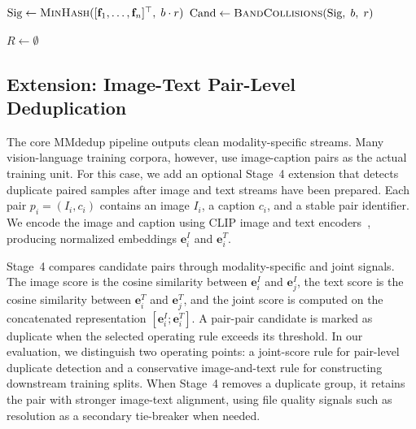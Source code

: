 \documentclass[conference]{IEEEtran}
\begin{document}
\begin{algorithm}[t]
\caption{Audio Deduplication}
\label{alg:audio_dedup}


$\text{Sig} \leftarrow 
\textsc{MinHash}([\mathbf{f}_1, \dots, \mathbf{f}_n]^\top,\; b \cdot r)$\;
$\text{Cand} \leftarrow 
\textsc{BandCollisions}(\text{Sig},\; b,\; r)$\;

$R \leftarrow \emptyset$

\end{algorithm}

\subsection{Extension: Image-Text Pair-Level Deduplication}
\label{sec:stage4_design}

The core MMdedup pipeline outputs clean modality-specific streams. Many vision-language training corpora, however, use image-caption pairs as the actual training unit. For this case, we add an optional Stage~4 extension that detects duplicate paired samples after image and text streams have been prepared. Each pair $p_i=(I_i, c_i)$ contains an image $I_i$, a caption $c_i$, and a stable pair identifier. We encode the image and caption using CLIP image and text encoders~\cite{radford2021learning}, producing normalized embeddings $\mathbf{e}^{I}_i$ and $\mathbf{e}^{T}_i$.

Stage~4 compares candidate pairs through modality-specific and joint signals. The image score is the cosine similarity between $\mathbf{e}^{I}_i$ and $\mathbf{e}^{I}_j$, the text score is the cosine similarity between $\mathbf{e}^{T}_i$ and $\mathbf{e}^{T}_j$, and the joint score is computed on the concatenated representation $[\mathbf{e}^{I}_i;\mathbf{e}^{T}_i]$. A pair-pair candidate is marked as duplicate when the selected operating rule exceeds its threshold. In our evaluation, we distinguish two operating points: a joint-score rule for pair-level duplicate detection and a conservative image-and-text rule for constructing downstream training splits. When Stage~4 removes a duplicate group, it retains the pair with stronger image-text alignment, using file quality signals such as resolution as a secondary tie-breaker when needed.
\end{document}
